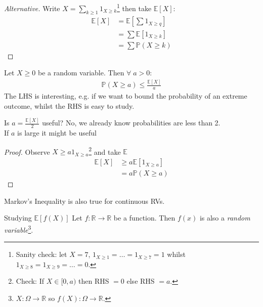 \begin{proof}[Alternative]
    Write $X = \sum_{k \geq 1} 1_{X \geq k}$\footnote{Sanity check: let $X = 7$, $1_{X \geq 1} = \dots = 1_{X \geq 7} = 1$ whilst $1_{X \geq 8} = 1_{X \geq 9} = \dots = 0$.} then take $\mathbb{E}[X]$:
    \begin{align*}
        \mathbb{E}[X] &= \mathbb{E}\left[\sum 1_{X \geq q}\right] \\
        &= \sum \mathbb{E}[1_{X \geq k}] \\
        &= \sum \mathbb{P}(X \geq k)
    \end{align*} 
\end{proof} 

\begin{claim} \label{clm:markov}
    Let $X \geq 0$ be a random variable.
    Then $\forall \; a > 0$:
    \begin{align*}
        \mathbb{P}(X \geq a) \leq \frac{\mathbb{E}[X]}{a}
    \end{align*} 
    \color{red} The LHS is interesting, e.g. if we want to bound the probability of an extreme outcome, whilst the RHS is easy to study.
\end{claim}

\begin{note} \color{blue}
    Is $a = \frac{\mathbb{E}[X]}{2}$ useful? No, we already know probabilities are less than 2. \\
    If $a$ is large it might be useful
\end{note} 

\begin{proof}
    Observe $X \geq a 1_{X \geq a}$\footnote{Check: If $X \in [0, a)$ then RHS $= 0$ else RHS $= a$.} and take $\mathbb{E}$
    \begin{align*}
        \mathbb{E}[X] &\geq a \mathbb{E}[1_{X \geq a}] \\
        &= a \mathbb{P}(X \geq a)
    \end{align*} 
\end{proof} 

\begin{note} \color{red}
    Markov's Inequality is also true for continuous RVs.
\end{note} 

Studying $\mathbb{E}[f(X)]$
Let $f: \mathbb{R} \to \mathbb{R}$ be a function.
Then $f(x)$ is also a \emph{random variable}\footnote{\color{blue} $X: \Omega \to \mathbb{R}$ so $f(X) : \Omega \to \mathbb{R}$.}.

